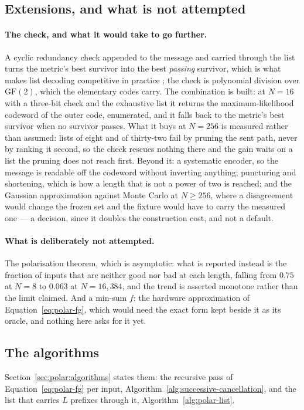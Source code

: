 \documentclass[11pt,a4paper]{article}
\begin{document}
\subsection{Extensions, and what is not attempted}
\label{sec:polar:extensions}
\paragraph{The check, and what it would take to go further.}
A cyclic redundancy check appended to the message and carried through the list
turns the metric's best survivor into the best \emph{passing} survivor, which
is what makes list decoding competitive in practice \citep{tal2015}; the check
is polynomial division over $\mathrm{GF}(2)$, which the elementary codes carry.
The combination is built: at $N = 16$ with a three-bit check and the exhaustive
list it returns the maximum-likelihood codeword of the outer code, enumerated,
and it falls back to the metric's best survivor when no survivor passes. What
it buys at $N = 256$ is measured rather than assumed: lists of eight and of
thirty-two fail by pruning the sent path, never by ranking it second, so the
check rescues nothing there and the gain waits on a list the pruning does not
reach first.
Beyond it: a systematic encoder, so the message is readable off the codeword
without inverting anything; puncturing and shortening, which is how a length
that is not a power of two is reached; and the Gaussian approximation against
Monte Carlo at $N \ge 256$, where a disagreement would change the frozen set
and the fixture would have to carry the measured one --- a decision, since it
doubles the construction cost, and not a default.

\paragraph{What is deliberately not attempted.}
The polarisation theorem, which is asymptotic: what is reported instead is the
fraction of inputs that are neither good nor bad at each length, falling from
$0.75$ at $N = 8$ to $0.063$ at $N = 16{,}384$, and the trend is asserted
monotone rather than the limit claimed. And a min-sum $f$: the hardware
approximation of Equation~\ref{eq:polar-fg}, which would need the exact form
kept beside it as its oracle, and nothing here asks for it yet.

\subsection{The algorithms}
Section~\ref{sec:polar:algorithms} states them: the recursive pass of
Equation~\ref{eq:polar-fg} per input, Algorithm~\ref{alg:successive-cancellation},
and the list that carries $L$ prefixes through it,
Algorithm~\ref{alg:polar-list}.
\end{document}
